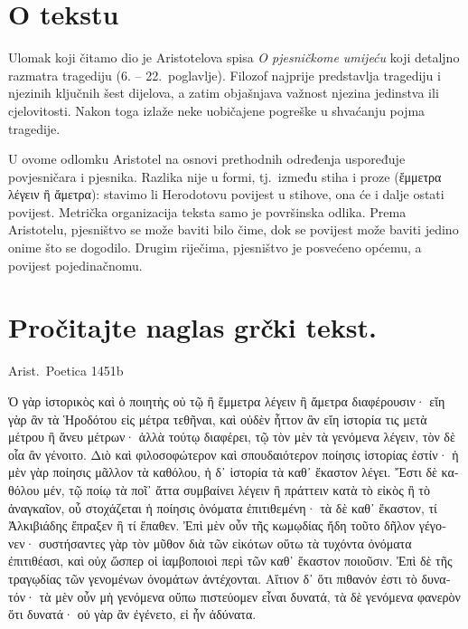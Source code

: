 
\section*{O tekstu}

Ulomak koji čitamo dio je Aristotelova spisa \textit{O pjesničkome umijeću} koji detaljno razmatra tragediju (6. – 22.\ poglavlje). Filozof najprije predstavlja tragediju i njezinih ključnih šest dijelova, a zatim objašnjava važnost njezina jedinstva ili cjelovitosti. Nakon toga izlaže neke uobičajene pogreške u shvaćanju pojma tragedije.
 
U ovome odlomku Aristotel na osnovi prethodnih određenja uspoređuje povjesničara i pjesnika. Razlika nije u formi, tj.\ između stiha i proze \textgreek[variant=ancient]{(ἔμμετρα λέγειν ἢ ἄμετρα):} stavimo li Herodotovu povijest u stihove, ona će i dalje ostati povijest. Metrička organizacija teksta samo je površinska odlika. Prema Aristotelu, pjesništvo se može baviti bilo čime, dok se povijest može baviti jedino onime što se dogodilo. Drugim riječima, pjesništvo je posvećeno općemu, a povijest pojedinačnomu.

\newpage

\section*{Pročitajte naglas grčki tekst.}

Arist.\ Poetica 1451b


\medskip


{\large

\begin{greek}

\noindent  Ὁ γὰρ ἱστορικὸς καὶ ὁ ποιητὴς οὐ τῷ ἢ ἔμμετρα λέγειν ἢ ἄμετρα διαφέρουσιν· εἴη γὰρ ἂν τὰ Ἡροδότου εἰς μέτρα τεθῆναι, καὶ οὐδὲν ἧττον ἂν εἴη ἱστορία τις μετὰ μέτρου ἢ ἄνευ μέτρων· ἀλλὰ τούτῳ διαφέρει, τῷ τὸν μὲν τὰ γενόμενα λέγειν, τὸν δὲ οἷα ἂν γένοιτο.  Διὸ καὶ φιλοσοφώτερον καὶ σπουδαιότερον ποίησις ἱστορίας ἐστίν· ἡ μὲν γὰρ ποίησις μᾶλλον τὰ καθόλου, ἡ δ᾿ ἱστορία τὰ καθ᾿ ἕκαστον λέγει. Ἔστι δὲ καθόλου μέν, τῷ ποίῳ τὰ ποῖ᾿ ἄττα συμβαίνει λέγειν ἢ πράττειν κατὰ τὸ εἰκὸς ἢ τὸ ἀναγκαῖον, οὗ στοχάζεται ἡ ποίησις ὀνόματα ἐπιτιθεμένη· τὰ δὲ καθ᾿ ἕκαστον, τί Ἀλκιβιάδης ἔπραξεν ἢ τί ἔπαθεν. Ἐπὶ μὲν οὖν τῆς κωμῳδίας ἤδη τοῦτο δῆλον γέγονεν· συστήσαντες γὰρ τὸν μῦθον διὰ τῶν εἰκότων οὕτω τὰ τυχόντα ὀνόματα ἐπιτιθέασι, καὶ οὐχ ὥσπερ οἱ ἰαμβοποιοὶ περὶ τῶν καθ᾿ ἕκαστον ποιοῦσιν. Ἐπὶ δὲ τῆς τραγῳδίας τῶν γενομένων ὀνομάτων ἀντέχονται. Αἴτιον δ᾿ ὅτι πιθανόν ἐστι τὸ δυνατόν· τὰ μὲν οὖν μὴ γενόμενα οὔπω πιστεύομεν εἶναι δυνατά, τὰ δὲ γενόμενα φανερὸν ὅτι δυνατά· οὐ γὰρ ἂν ἐγένετο, εἰ ἦν ἀδύνατα.

\end{greek}

}



